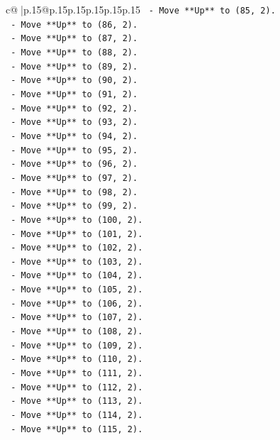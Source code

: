 \documentclass{article}
\begin{document}
{\begin{supertabular}{c@{$\;$}|p{.15\linewidth}@{}p{.15\linewidth}p{.15\linewidth}p{.15\linewidth}p{.15\linewidth}p{.15\linewidth}}
{{{\texttt{    {-} Move **Up** to (85, 2).} \\
\texttt{    {-} Move **Up** to (86, 2).} \\
\texttt{    {-} Move **Up** to (87, 2).} \\
\texttt{    {-} Move **Up** to (88, 2).} \\
\texttt{    {-} Move **Up** to (89, 2).} \\
\texttt{    {-} Move **Up** to (90, 2).} \\
\texttt{    {-} Move **Up** to (91, 2).} \\
\texttt{    {-} Move **Up** to (92, 2).} \\
\texttt{    {-} Move **Up** to (93, 2).} \\
\texttt{    {-} Move **Up** to (94, 2).} \\
\texttt{    {-} Move **Up** to (95, 2).} \\
\texttt{    {-} Move **Up** to (96, 2).} \\
\texttt{    {-} Move **Up** to (97, 2).} \\
\texttt{    {-} Move **Up** to (98, 2).} \\
\texttt{    {-} Move **Up** to (99, 2).} \\
\texttt{    {-} Move **Up** to (100, 2).} \\
\texttt{    {-} Move **Up** to (101, 2).} \\
\texttt{    {-} Move **Up** to (102, 2).} \\
\texttt{    {-} Move **Up** to (103, 2).} \\
\texttt{    {-} Move **Up** to (104, 2).} \\
\texttt{    {-} Move **Up** to (105, 2).} \\
\texttt{    {-} Move **Up** to (106, 2).} \\
\texttt{    {-} Move **Up** to (107, 2).} \\
\texttt{    {-} Move **Up** to (108, 2).} \\
\texttt{    {-} Move **Up** to (109, 2).} \\
\texttt{    {-} Move **Up** to (110, 2).} \\
\texttt{    {-} Move **Up** to (111, 2).} \\
\texttt{    {-} Move **Up** to (112, 2).} \\
\texttt{    {-} Move **Up** to (113, 2).} \\
\texttt{    {-} Move **Up** to (114, 2).} \\
\texttt{    {-} Move **Up** to (115, 2).} \\
}}}
\end{supertabular}}
\end{document}
